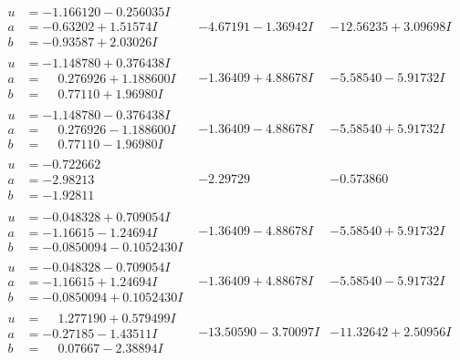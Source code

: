 \documentclass[1p]{elsarticle_modified}
\theoremstyle{definition}
\begin{document}
$$\begin{array}{c|c|c}
\begin{aligned}
u &= -1.166120 - 0.256035 I \\
a &= -0.63202 + 1.51574 I \\
b &= -0.93587 + 2.03026 I\end{aligned}
 & -4.67191 - 1.36942 I & -12.56235 + 3.09698 I \\ \hline\begin{aligned}
u &= -1.148780 + 0.376438 I \\
a &= \phantom{-}0.276926 + 1.188600 I \\
b &= \phantom{-}0.77110 + 1.96980 I\end{aligned}
 & -1.36409 + 4.88678 I & -5.58540 - 5.91732 I \\ \hline\begin{aligned}
u &= -1.148780 - 0.376438 I \\
a &= \phantom{-}0.276926 - 1.188600 I \\
b &= \phantom{-}0.77110 - 1.96980 I\end{aligned}
 & -1.36409 - 4.88678 I & -5.58540 + 5.91732 I \\ \hline\begin{aligned}
u &= -0.722662\phantom{ +0.000000I} \\
a &= -2.98213\phantom{ +0.000000I} \\
b &= -1.92811\phantom{ +0.000000I}\end{aligned}
 & -2.29729\phantom{ +0.000000I} & -0.573860\phantom{ +0.000000I} \\ \hline\begin{aligned}
u &= -0.048328 + 0.709054 I \\
a &= -1.16615 - 1.24694 I \\
b &= -0.0850094 - 0.1052430 I\end{aligned}
 & -1.36409 - 4.88678 I & -5.58540 + 5.91732 I \\ \hline\begin{aligned}
u &= -0.048328 - 0.709054 I \\
a &= -1.16615 + 1.24694 I \\
b &= -0.0850094 + 0.1052430 I\end{aligned}
 & -1.36409 + 4.88678 I & -5.58540 - 5.91732 I \\ \hline\begin{aligned}
u &= \phantom{-}1.277190 + 0.579499 I \\
a &= -0.27185 - 1.43511 I \\
b &= \phantom{-}0.07667 - 2.38894 I\end{aligned}
 & -13.50590 - 3.70097 I & -11.32642 + 2.50956 I \\ \hline\begin{aligned}

\end{aligned}
\end{array}$$
\end{document}
